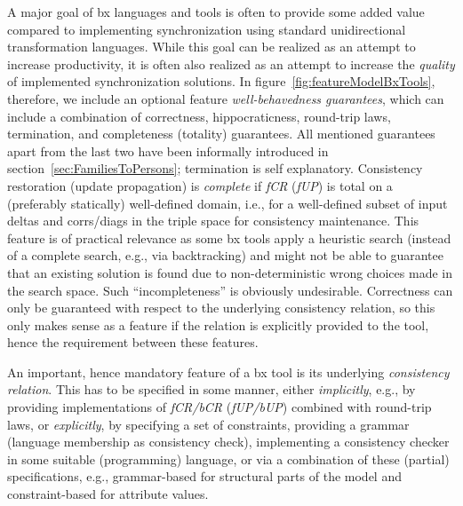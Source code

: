 A major goal of bx languages and tools is often to provide some added value compared to implementing synchronization using standard unidirectional transformation languages.
While this goal can be realized as an attempt to increase productivity, it is often also realized as an attempt to increase the \emph{quality} of implemented synchronization solutions.
In figure~\ref{fig:featureModelBxTools}, therefore, we include an optional feature \emph{well-behavedness guarantees}, which can include a combination of correctness, hippocraticness, round-trip laws, termination, and completeness (totality) guarantees.
All mentioned guarantees apart from the last two have been informally introduced in section~\ref{sec:FamiliesToPersons}; termination is self explanatory.
Consistency restoration (update propagation) is \emph{complete} if \emph{fCR} (\emph{fUP}) is total on a  (preferably statically) well-defined domain, i.e., for a well-defined subset of input deltas and corrs/diags in the triple space for consistency maintenance.
This feature is of practical relevance as some bx tools apply a heuristic search (instead of a complete search, e.g., via backtracking) and might not be able to guarantee that an existing solution is found due to non-deterministic wrong choices made in the search space.
Such ``incompleteness'' is obviously undesirable.
Correctness can only be guaranteed with respect to the underlying consistency relation, so this only makes sense as a feature if the relation is explicitly provided to the tool, hence the requirement between these features. 

An important, hence mandatory feature of a bx tool is its underlying \emph{consistency relation}.
This has to be specified in some manner, either \emph{implicitly}, e.g., by providing implementations of \emph{fCR/bCR} (\emph{fUP/bUP}) combined with round-trip laws, or \emph{explicitly}, by specifying a set of constraints, providing a grammar (language membership as consistency check), implementing a consistency checker in some suitable (programming) language, or via a combination of these (partial) specifications, e.g., grammar-based for structural parts of the model and constraint-based for attribute values.

